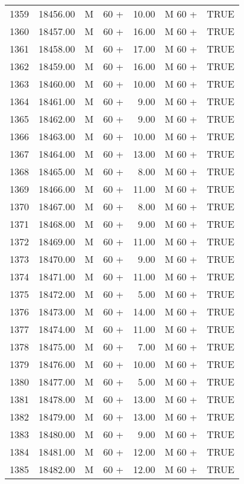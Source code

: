 \begin{table}[ht]
\begin{tabular}{rrllrll}
  1359 & 18456.00 & M & 60 + & 10.00 & M 60 + & TRUE \\ 
  1360 & 18457.00 & M & 60 + & 16.00 & M 60 + & TRUE \\ 
  1361 & 18458.00 & M & 60 + & 17.00 & M 60 + & TRUE \\ 
  1362 & 18459.00 & M & 60 + & 16.00 & M 60 + & TRUE \\ 
  1363 & 18460.00 & M & 60 + & 10.00 & M 60 + & TRUE \\ 
  1364 & 18461.00 & M & 60 + & 9.00 & M 60 + & TRUE \\ 
  1365 & 18462.00 & M & 60 + & 9.00 & M 60 + & TRUE \\ 
  1366 & 18463.00 & M & 60 + & 10.00 & M 60 + & TRUE \\ 
  1367 & 18464.00 & M & 60 + & 13.00 & M 60 + & TRUE \\ 
  1368 & 18465.00 & M & 60 + & 8.00 & M 60 + & TRUE \\ 
  1369 & 18466.00 & M & 60 + & 11.00 & M 60 + & TRUE \\ 
  1370 & 18467.00 & M & 60 + & 8.00 & M 60 + & TRUE \\ 
  1371 & 18468.00 & M & 60 + & 9.00 & M 60 + & TRUE \\ 
  1372 & 18469.00 & M & 60 + & 11.00 & M 60 + & TRUE \\ 
  1373 & 18470.00 & M & 60 + & 9.00 & M 60 + & TRUE \\ 
  1374 & 18471.00 & M & 60 + & 11.00 & M 60 + & TRUE \\ 
  1375 & 18472.00 & M & 60 + & 5.00 & M 60 + & TRUE \\ 
  1376 & 18473.00 & M & 60 + & 14.00 & M 60 + & TRUE \\ 
  1377 & 18474.00 & M & 60 + & 11.00 & M 60 + & TRUE \\ 
  1378 & 18475.00 & M & 60 + & 7.00 & M 60 + & TRUE \\ 
  1379 & 18476.00 & M & 60 + & 10.00 & M 60 + & TRUE \\ 
  1380 & 18477.00 & M & 60 + & 5.00 & M 60 + & TRUE \\ 
  1381 & 18478.00 & M & 60 + & 13.00 & M 60 + & TRUE \\ 
  1382 & 18479.00 & M & 60 + & 13.00 & M 60 + & TRUE \\ 
  1383 & 18480.00 & M & 60 + & 9.00 & M 60 + & TRUE \\ 
  1384 & 18481.00 & M & 60 + & 12.00 & M 60 + & TRUE \\ 
  1385 & 18482.00 & M & 60 + & 12.00 & M 60 + & TRUE \\ 

\end{tabular}
\end{table}
